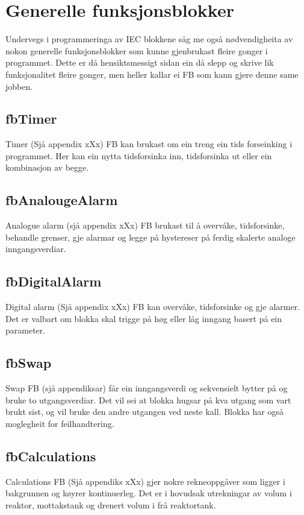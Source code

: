 \section{Generelle funksjonsblokker}
\thispagestyle{fancy}


Undervegs i programmeringa av \gls{IEC} blokkene såg me også nødvendigheita av nokon generelle funksjonsblokker
som kunne gjenbrukast fleire gonger i programmet. Dette er då hensiktsmessigt sidan ein då slepp og skrive lik 
funksjonalitet fleire gonger, men heller kallar ei \gls{FB} som kann gjere denne same jobben.

\subsection{fbTimer}
Timer (Sjå appendix xXx) \gls{FB} kan brukast om ein treng ein tids forseinking i programmet.
Her kan ein nytta tidsforsinka inn, tidsforsinka ut eller ein kombinasjon av begge.

\subsection{fbAnalougeAlarm}
Analogue alarm (sjå appendix xXx) \gls{FB} brukast til å overvåke, tidsforsinke, behandle grenser, 
gje alarmar og legge på hystereser på ferdig skalerte analoge inngangsverdiar.

\subsection{fbDigitalAlarm}
Digital alarm (Sjå appendix xXx) \gls{FB} kan overvåke, tidsforsinke og gje alarmer. Det er valbart om blokka skal trigge på høg eller låg
inngang basert på ein parameter.

\subsection{fbSwap}
Swap \gls{FB} (sjå appendiksar) får ein inngangsverdi og sekvensielt bytter på og bruke to utgangsverdiar. Det vil sei at blokka hugsar på kva utgang som vart brukt sist,
og vil bruke den andre utgangen ved neste kall. Blokka har også moglegheit for feilhandtering.

\subsection{fbCalculations}
Calculations \gls{FB} (Sjå appendiks xXx) gjer nokre rekneoppgåver som ligger i bakgrunnen og køyrer kontinuerleg. 
Det er i hovudsak utrekningar av volum i reaktor, mottakstank og drenert volum i frå reaktortank.

